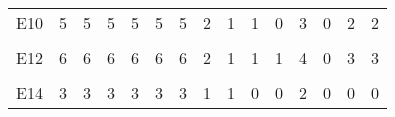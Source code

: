 \begin{table}[H]
{\begin{tabular}[t]{lrrrrrrrrrrrrrr}
E10 & 5 & 5 & 5 & 5 & 5 & 5 & 2 & 1 & 1 & 0 & 3 & 0 & 2 & 2\\
\addlinespace
\cellcolor{gray!6}{E11} & \cellcolor{gray!6}{4} & \cellcolor{gray!6}{4} & \cellcolor{gray!6}{4} & \cellcolor{gray!6}{4} & \cellcolor{gray!6}{4} & \cellcolor{gray!6}{4} & \cellcolor{gray!6}{2} & \cellcolor{gray!6}{3} & \cellcolor{gray!6}{1} & \cellcolor{gray!6}{2} & \cellcolor{gray!6}{0} & \cellcolor{gray!6}{2} & \cellcolor{gray!6}{3} & \cellcolor{gray!6}{3}\\
E12 & 6 & 6 & 6 & 6 & 6 & 6 & 2 & 1 & 1 & 1 & 4 & 0 & 3 & 3\\
\cellcolor{gray!6}{E13} & \cellcolor{gray!6}{3} & \cellcolor{gray!6}{3} & \cellcolor{gray!6}{3} & \cellcolor{gray!6}{3} & \cellcolor{gray!6}{3} & \cellcolor{gray!6}{3} & \cellcolor{gray!6}{1} & \cellcolor{gray!6}{1} & \cellcolor{gray!6}{0} & \cellcolor{gray!6}{0} & \cellcolor{gray!6}{2} & \cellcolor{gray!6}{0} & \cellcolor{gray!6}{0} & \cellcolor{gray!6}{0}\\
E14 & 3 & 3 & 3 & 3 & 3 & 3 & 1 & 1 & 0 & 0 & 2 & 0 & 0 & 0\\
\bottomrule
\end{tabular}}
\end{table}
